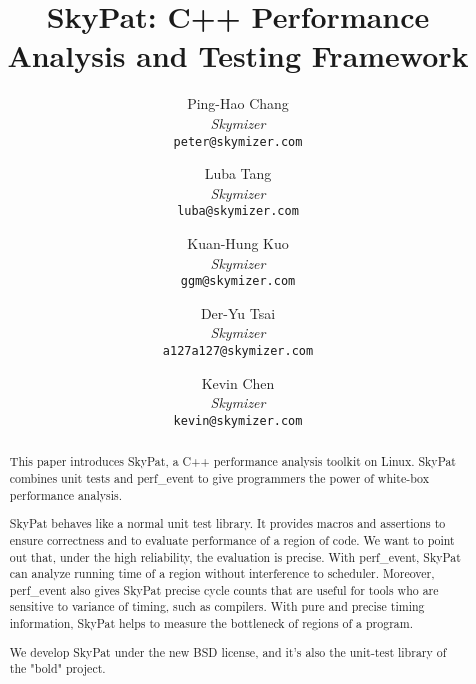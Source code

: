 \documentclass[final]{ols}
\begin{document}
\title{SkyPat: C++ Performance Analysis and Testing Framework}
\subtitle{}

\author{
	Ping-Hao Chang \\
	{\em Skymizer}\\
	{\tt\small peter@skymizer.com}\\
\and
	Luba Tang\\
	{\em Skymizer}\\
	{\tt\small luba@skymizer.com}\\
\and
	Kuan-Hung Kuo\\
	{\em Skymizer}\\
	{\tt\small ggm@skymizer.com}\\
\and
	Der-Yu Tsai\\
	{\em Skymizer}\\
	{\tt\small a127a127@skymizer.com}\\
\and
	Kevin Chen\\
	{\em Skymizer}\\
	{\tt\small kevin@skymizer.com}
}

\date{} %

\maketitle


\begin{abstract}
This paper introduces SkyPat, a C++ performance analysis toolkit on Linux. SkyPat combines unit tests and perf\_event to give programmers the power of white-box performance analysis.

SkyPat behaves like a normal unit test library. It provides macros and assertions to ensure correctness and to evaluate performance of a region of code. We want to point out that, under the high reliability, the evaluation is precise. With perf\_event, SkyPat can analyze running time of a region without interference to scheduler. Moreover, perf\_event also gives SkyPat precise cycle counts that are useful for tools who are sensitive to variance of timing, such as compilers. With pure and precise timing information, SkyPat helps to measure the bottleneck of regions of a program.

We develop SkyPat under the new BSD license, and it's also the unit-test library of the "bold" project.
\end{abstract}
\end{document}

